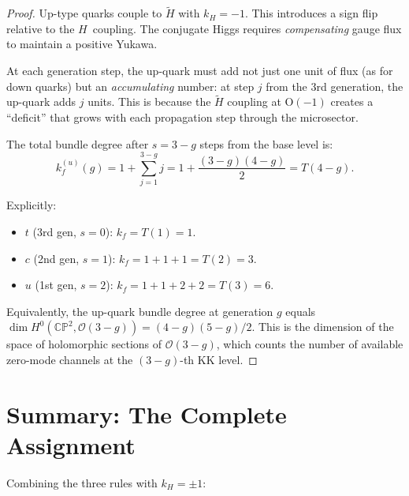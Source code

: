 \documentclass[11pt,a4paper]{article}
\newcommand{\CP}{\mathbb{CP}}
\theoremstyle{definition}
\theoremstyle{remark}
\begin{document}
\begin{proof}
Up-type quarks couple to $\tilde{H}$ with $k_H = -1$.  This introduces
a sign flip relative to the $H$~coupling.  The conjugate Higgs
requires \emph{compensating} gauge flux to maintain a positive Yukawa.

At each generation step, the up-quark must add not just one unit of
flux (as for down quarks) but an \emph{accumulating} number:
at step $j$ from the 3rd generation, the up-quark adds $j$ units.
This is because the $\tilde{H}$ coupling at O$(-1)$ creates a
``deficit'' that grows with each propagation step through the microsector.

The total bundle degree after $s = 3 - g$ steps from the base level is:
\[
k_f^{(u)}(g) = 1 + \sum_{j=1}^{3-g} j = 1 + \frac{(3-g)(4-g)}{2} = T(4-g).
\]

Explicitly:
\begin{itemize}
\item $t$ (3rd gen, $s=0$): $k_f = T(1) = 1$.
\item $c$ (2nd gen, $s=1$): $k_f = 1 + 1 + 1 = T(2) = 3$.
\item $u$ (1st gen, $s=2$): $k_f = 1 + 1 + 2 + 2 = T(3) = 6$.
\end{itemize}

Equivalently, the up-quark bundle degree at generation $g$ equals
$\dim H^0(\CP^2, \mathcal{O}(3-g)) = (4-g)(5-g)/2$.  This is the
dimension of the space of holomorphic sections of $\mathcal{O}(3-g)$,
which counts the number of available zero-mode channels at the
$(3-g)$-th KK level.
\end{proof}

\section{Summary: The Complete Assignment}
\label{sec:summary}

Combining the three rules with $k_H = \pm 1$:
\end{document}
